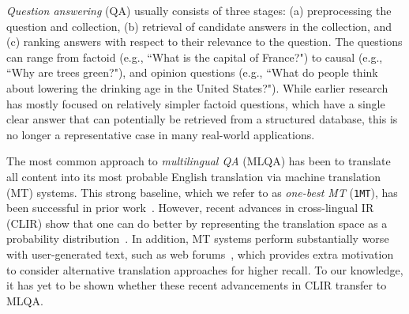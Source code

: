 \documentclass{sig-alternate-05-2015}
\newcommand{\red}[1]{\textcolor{red}{#1}}
\newcommand{\ignore}[1]{}
\begin{document}
\emph{Question answering} (QA) usually consists of three stages: 
(a) preprocessing the question and collection, (b) retrieval of candidate answers in the collection, and (c) ranking answers with respect 
to their relevance to the question. The questions can range from factoid (e.g., ``What is the capital of France?") 
to causal (e.g., ``Why are trees green?"), and opinion questions 
(e.g., ``What do people think about lowering the drinking age in the United States?"). While earlier research has mostly focused on relatively 
simpler factoid questions, which have a single clear answer that can potentially be retrieved from a structured database, this is no longer 
a representative case in many real-world applications. 



 

\ignore{With more languages represented in the Web, 
QA systems (especially ones that use the Web as a data source) need to handle multilingual text effectively, even when the user is 
monolingual.}
The most common approach to \emph{multilingual QA} (MLQA) has been to translate all content into its most probable 
English translation via machine translation (MT) systems. This strong baseline, which we refer to as \emph{one-best MT} ({\tt 1MT}), has 
been successful in prior work~\cite{Adafre:2009aa,Hartrumpf:2009aa,Martinez-Gonzalez:2009aa,Lin:aa,Shima:2010aa}. 
However, recent advances in cross-lingual IR (CLIR) show that one can do better by representing the translation space 
as a probability distribution~\cite{Ture:2014aa}. In addition, MT systems perform substantially worse with user-generated text, such as web 
forums~\cite{Wees:2015aa}, which provides extra motivation to consider alternative translation approaches for higher recall.
To our knowledge, it has yet to be shown whether these recent advancements in CLIR transfer to MLQA.
\end{document}
